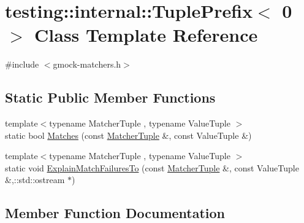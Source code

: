 \hypertarget{classtesting_1_1internal_1_1TuplePrefix_3_010_01_4}{}\section{testing\+:\+:internal\+:\+:Tuple\+Prefix$<$ 0 $>$ Class Template Reference}
\label{classtesting_1_1internal_1_1TuplePrefix_3_010_01_4}


{\ttfamily \#include $<$gmock-\/matchers.\+h$>$}

\subsection*{Static Public Member Functions}
\begin{DoxyCompactItemize}
\item 
{\footnotesize template$<$typename Matcher\+Tuple , typename Value\+Tuple $>$ }\\static bool \hyperlink{classtesting_1_1internal_1_1TuplePrefix_3_010_01_4_a8bb323da9f209f4fef5d81d7c0b628e9}{Matches} (const \hyperlink{structtesting_1_1internal_1_1MatcherTuple}{Matcher\+Tuple} \&, const Value\+Tuple \&)
\item 
{\footnotesize template$<$typename Matcher\+Tuple , typename Value\+Tuple $>$ }\\static void \hyperlink{classtesting_1_1internal_1_1TuplePrefix_3_010_01_4_a8c86e2f864d1210f10f0faf980bc2758}{Explain\+Match\+Failures\+To} (const \hyperlink{structtesting_1_1internal_1_1MatcherTuple}{Matcher\+Tuple} \&, const Value\+Tuple \&,\+::std\+::ostream $\ast$)
\end{DoxyCompactItemize}


\subsection{Member Function Documentation}
